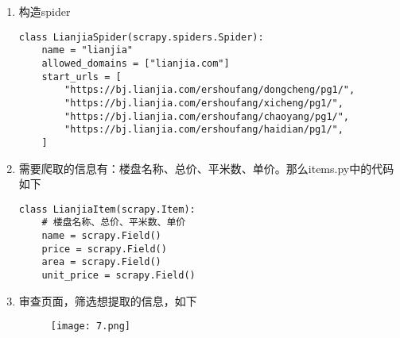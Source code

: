 \documentclass[lang=cn,11pt,a4paper]{elegantpaper}
\begin{document}
\begin{enumerate}
    \item 构造spider
    \begin{lstlisting}
class LianjiaSpider(scrapy.spiders.Spider):
    name = "lianjia"
    allowed_domains = ["lianjia.com"]
    start_urls = [
        "https://bj.lianjia.com/ershoufang/dongcheng/pg1/",
        "https://bj.lianjia.com/ershoufang/xicheng/pg1/",
        "https://bj.lianjia.com/ershoufang/chaoyang/pg1/",
        "https://bj.lianjia.com/ershoufang/haidian/pg1/",
    ]
    \end{lstlisting}
    \item 需要爬取的信息有：楼盘名称、总价、平米数、单价。那么items.py中的代码如下
    \begin{lstlisting}
class LianjiaItem(scrapy.Item):
    # 楼盘名称、总价、平米数、单价
    name = scrapy.Field()
    price = scrapy.Field()
    area = scrapy.Field()
    unit_price = scrapy.Field()

    \end{lstlisting}
    \item 审查页面，筛选想提取的信息，如下
    \begin{figure}[!htb]
    \centering
    \texttt{[image: 7.png]}
    \end{figure}
    

\end{enumerate}
\end{document}
